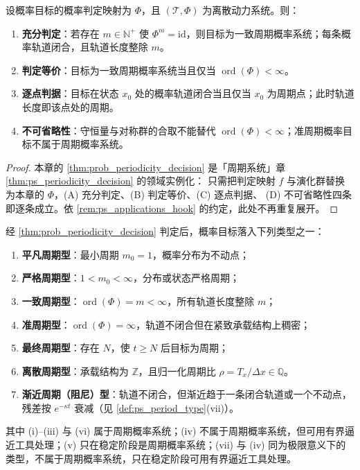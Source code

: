 \begin{theorem}[概率周期性判定定理]\label{thm:prob_periodicity_decision}
设概率目标的概率判定映射为 $\Phi$，且 $(\mathcal T,\Phi)$ 为离散动力系统。则：
\begin{enumerate}[label=(\Alph*)]
    \item \textbf{充分判定}：若存在 $m\in\mathbb N^+$ 使 $\Phi^m=\mathrm{id}$，则目标为一致周期概率系统；每条概率轨道闭合，且轨道长度整除 $m$。
    \item \textbf{判定等价}：目标为一致周期概率系统当且仅当 $\operatorname{ord}(\Phi)<\infty$。
    \item \textbf{逐点判据}：目标在状态 $x_0$ 处的概率轨道闭合当且仅当 $x_0$ 为周期点；此时轨道长度即该点处的周期。
    \item \textbf{不可省略性}：守恒量与对称群的合取不能替代 $\operatorname{ord}(\Phi)<\infty$；准周期概率目标不属于周期概率系统。
\end{enumerate}
\end{theorem}

\begin{proof}
本章的 \cref{thm:prob_periodicity_decision} 是「周期系统」章 \cref{thm:ps_periodicity_decision} 的领域实例化：
只需把判定映射 $f$ 与演化群替换为本章的 $\Phi$，(A) 充分判定、(B) 判定等价、(C) 逐点判据、
(D) 不可省略性四条即逐条成立。依 \cref{rem:ps_applications_hook} 的约定，此处不再重复展开。
\end{proof}

\begin{corollary}[概率周期类型]\label{cor:prob_period_type}
经 \cref{thm:prob_periodicity_decision} 判定后，概率目标落入下列类型之一：
\begin{enumerate}[label=(\roman*)]
    \item \textbf{平凡周期型}：最小周期 $m_0=1$，概率分布为不动点；
    \item \textbf{严格周期型}：$1<m_0<\infty$，分布或状态严格周期；
    \item \textbf{一致周期型}：$\operatorname{ord}(\Phi)=m<\infty$，所有轨道长度整除 $m$；
    \item \textbf{准周期型}：$\operatorname{ord}(\Phi)=\infty$，轨道不闭合但在紧致承载结构上稠密；
    \item \textbf{最终周期型}：存在 $N$，使 $t\ge N$ 后目标为周期；
    \item \textbf{离散周期型}：承载结构为 $\mathbb Z$，且归一化周期比 $\rho=T_x/\Delta x\in\mathbb Q$。
    \item \textbf{渐近周期（阻尼）型}：轨道不闭合，但渐近趋于一条闭合轨道或一个不动点，残差按 $e^{-\kappa t}$ 衰减（见 \cref{def:ps_period_type}(vii)）。
\end{enumerate}
其中 (i)--(iii) 与 (vi) 属于周期概率系统；(iv) 不属于周期概率系统，但可用有界逼近工具处理；(v) 只在稳定阶段是周期概率系统；(vii) 与 (iv) 同为极限意义下的类型，不属于周期概率系统，只在稳定阶段可用有界逼近工具处理。
\end{corollary}

